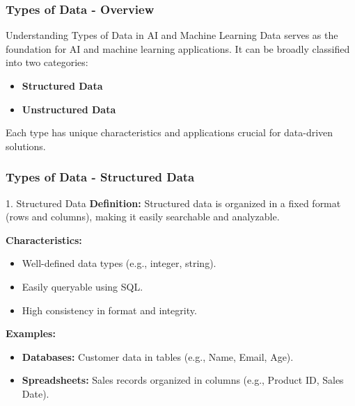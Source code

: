\documentclass[aspectratio=169]{beamer}
\begin{document}
\begin{frame}[fragile]
    \frametitle{Types of Data - Overview}
    \begin{block}{Understanding Types of Data in AI and Machine Learning}
        Data serves as the foundation for AI and machine learning applications. 
        It can be broadly classified into two categories:
        \begin{itemize}
            \item \textbf{Structured Data}
            \item \textbf{Unstructured Data}
        \end{itemize}
        Each type has unique characteristics and applications crucial for data-driven solutions.
    \end{block}
\end{frame}

\begin{frame}[fragile]
    \frametitle{Types of Data - Structured Data}
    \begin{block}{1. Structured Data}
        \textbf{Definition:} 
        Structured data is organized in a fixed format (rows and columns), making it easily searchable and analyzable.

        \textbf{Characteristics:}
        \begin{itemize}
            \item Well-defined data types (e.g., integer, string).
            \item Easily queryable using SQL.
            \item High consistency in format and integrity.
        \end{itemize}

        \textbf{Examples:}
        \begin{itemize}
            \item \textbf{Databases:} Customer data in tables (e.g., Name, Email, Age).
            \item \textbf{Spreadsheets:} Sales records organized in columns (e.g., Product ID, Sales Date).
        \end{itemize}
    \end{block}
\end{frame}
\end{document}
